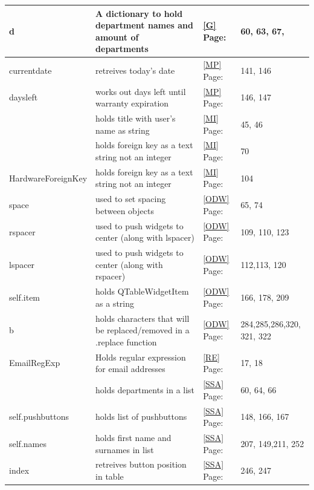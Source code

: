 \begin{center}
\begin{longtable}{|p{4cm}|p{3cm}|p{2cm}|p{3cm}|}
d & A dictionary to hold department names and amount of departments& \ref{G} Page: \pageref{G} & 60, 63, 67,  \\ \hline 

currentdate & retreives today's date& \ref{MP} Page: \pageref{MP} & 141, 146  \\ \hline
daysleft & works out days left until warranty expiration& \ref{MP} Page: \pageref{MP} & 146, 147  \\ \hline

\verb name_lbl & holds title with user's name as string& \ref{MI} Page: \pageref{MI} & 45, 46  \\ \hline
\verb Foreign_Item & holds foreign key as a text string not an integer & \ref{MI} Page: \pageref{MI} & 70\\ \hline
HardwareForeignKey & holds foreign key as a text string not an integer & \ref{MI} Page: \pageref{MI} & 104 \\ \hline

space & used to set spacing between objects& \ref{ODW} Page: \pageref{ODW} & 65, 74  \\ \hline
rspacer & used to push widgets to center (along with lspacer)& \ref{ODW} Page: \pageref{ODW} & 109, 110, 123 \\ \hline
lspacer & used to push widgets to center (along with rspacer)& \ref{ODW} Page: \pageref{ODW} & 112,113, 120 \\ \hline
self.item & holds QTableWidgetItem as a string & \ref{ODW}  Page: \pageref{ODW}& 166, 178, 209 \\ \hline
b &holds characters that will be replaced/removed in a .replace function& \ref{ODW} Page: \pageref{ODW} &284,285,286,320, 321, 322 \\ \hline

EmailRegExp & Holds regular expression for email addresses& \ref{RE} Page: \pageref{RE} & 17, 18  \\ \hline

\verb field_names & holds departments in a list& \ref{SSA} Page: \pageref{SSA} &  60, 64, 66  \\ \hline
self.pushbuttons & holds list of pushbuttons & \ref{SSA} Page: \pageref{SSA} & 148, 166, 167\\ \hline
self.names & holds first name and surnames in list& \ref{SSA} Page: \pageref{SSA} & 207, 149,211, 252  \\ \hline
index & retreives button position in table& \ref{SSA} Page: \pageref{SSA} & 246, 247 \\ \hline









\end{longtable}
\end{center}

